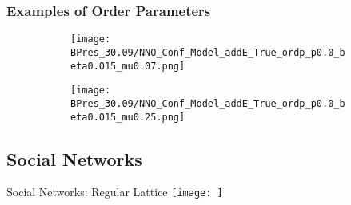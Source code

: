 \documentclass[xcolor={dvipsnames}]{beamer}
\begin{document}
\begin{frame}
	\frametitle{Examples of Order Parameters}
	\begin{figure}[t]
		\begin{subfigure}[t]{0.6\linewidth}
			\vspace{-.5cm}
			\centering
			\texttt{[image: BPres\_30.09/NNO\_Conf\_Model\_addE\_True\_ordp\_p0.0\_beta0.015\_mu0.07.png]} 
			\label{fig:Ordp_OPSW_COVID19_D14}
		\end{subfigure}
		\begin{subfigure}[t]{0.6\linewidth}
			\vspace{-0.5cm}
			\centering
			\texttt{[image: BPres\_30.09/NNO\_Conf\_Model\_addE\_True\_ordp\_p0.0\_beta0.015\_mu0.25.png]}
			\label{fig:Ordp_OPSW_highmu_COVID19}
		\end{subfigure}
		\label{fig:Ordp_OPSW_COVID19_panel}
	\end{figure}
\end{frame}

\subsection{Social Networks}
\begin{frame}{Social Networks: Regular Lattice}
	\texttt{[image: ]}
\end{frame}
\end{document}
